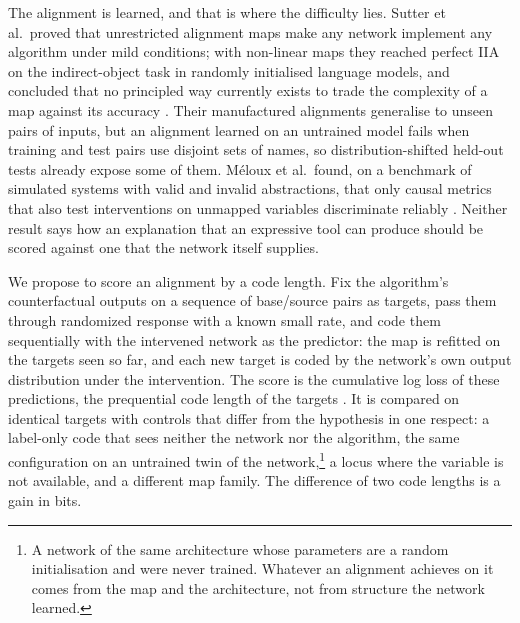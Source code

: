 \documentclass[11pt,a4paper]{article}
\begin{document}
The alignment is learned, and that is where the difficulty lies. Sutter et al.\ proved that unrestricted alignment maps make any network implement any algorithm under mild conditions; with non-linear maps they reached perfect IIA on the indirect-object task in randomly initialised language models, and concluded that no principled way currently exists to trade the complexity of a map against its accuracy \cite{sutter2025}. Their manufactured alignments generalise to unseen pairs of inputs, but an alignment learned on an untrained model fails when training and test pairs use disjoint sets of names, so distribution-shifted held-out tests already expose some of them. Méloux et al.\ found, on a benchmark of simulated systems with valid and invalid abstractions, that only causal metrics that also test interventions on unmapped variables discriminate reliably \cite{meloux2026}. Neither result says how an explanation that an expressive tool can produce should be scored against one that the network itself supplies.

We propose to score an alignment by a code length. Fix the algorithm's counterfactual outputs on a sequence of base/source pairs as targets, pass them through randomized response with a known small rate, and code them sequentially with the intervened network as the predictor: the map is refitted on the targets seen so far, and each new target is coded by the network's own output distribution under the intervention. The score is the cumulative log loss of these predictions, the prequential code length of the targets \cite{dawid1984}. It is compared on identical targets with controls that differ from the hypothesis in one respect: a label-only code that sees neither the network nor the algorithm, the same configuration on an untrained twin of the network,\footnote{A network of the same architecture whose parameters are a random initialisation and were never trained. Whatever an alignment achieves on it comes from the map and the architecture, not from structure the network learned.} a locus where the variable is not available, and a different map family. The difference of two code lengths is a gain in bits.
\end{document}
